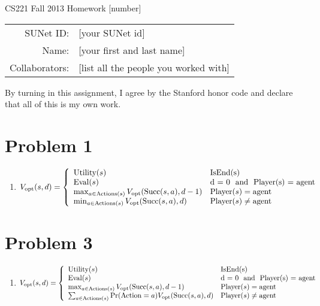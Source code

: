 \documentclass[12pt]{article}
\begin{document}
\begin{center}
{\Large CS221 Fall 2013 Homework [number]}

\begin{tabular}{rl}
SUNet ID: & [your SUNet id] \\
Name: & [your first and last name] \\
Collaborators: & [list all the people you worked with]
\end{tabular}
\end{center}

By turning in this assignment, I agree by the Stanford honor code and declare
that all of this is my own work.

\section*{Problem 1}

\begin{enumerate}[label=(\alph*)]
  \item $V_{\text{opt}}(s, d) = 
  \left\{
  \begin{array}{ll}
  \text{Utility}(s)  & \text{IsEnd(s)} \\ 
  \text{Eval}(s)  & \text{d = 0 \text{ and } \text{Player}(s) = \text{agent}} \\ 
  \max_{a \in \text{Actions}(s)}  V_{\text{opt}}(\text{Succ}(s, a), d-1) & \text{Player}(s) = \text{agent} \\ 
  \min_{a \in \text{Actions}(s)}  V_{\text{opt}}(\text{Succ}(s, a), d) & \text{Player}(s) \ne \text{agent} \\ 
  \end{array}
  \right.$
\end{enumerate}

\section*{Problem 3}

\begin{enumerate}[label=(\alph*)]
  \item $V_{\text{opt}}(s, d) = 
  \left\{
  \begin{array}{ll}
  \text{Utility}(s)  & \text{IsEnd(s)} \\ 
  \text{Eval}(s)  & \text{d = 0 \text{ and } \text{Player}(s) = \text{agent}} \\ 
  \max_{a \in \text{Actions}(s)}  V_{\text{opt}}(\text{Succ}(s, a), d-1) & \text{Player}(s) = \text{agent} \\ 
  \sum_{a \in \text{Actions}(s)}  \Pr(\text{Action} = a)V_{\text{opt}}(\text{Succ}(s, a), d) & \text{Player}(s) \ne \text{agent} \\ 
  \end{array}
  \right.$
\end{enumerate}
\end{document}
